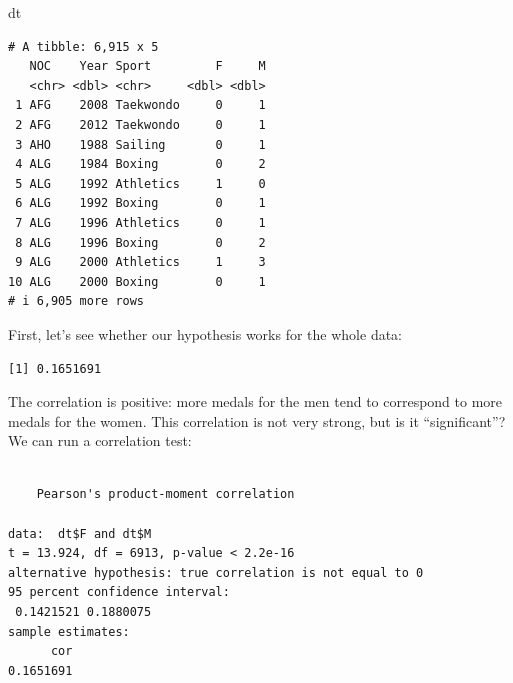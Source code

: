 \documentclass[
  letterpaper,
  DIV=11,
  numbers=noendperiod]{scrreprt}
\newenvironment{Shaded}{\begin{snugshade}}{\end{snugshade}}
\newcommand{\FunctionTok}[1]{\textcolor[rgb]{0.28,0.35,0.67}{#1}}
\newcommand{\NormalTok}[1]{\textcolor[rgb]{0.00,0.23,0.31}{#1}}
\newcommand{\SpecialCharTok}[1]{\textcolor[rgb]{0.37,0.37,0.37}{#1}}
\begin{document}
\begin{Shaded}
\begin{Highlighting}[]
\NormalTok{dt}
\end{Highlighting}
\end{Shaded}

\begin{verbatim}
# A tibble: 6,915 x 5
   NOC    Year Sport         F     M
   <chr> <dbl> <chr>     <dbl> <dbl>
 1 AFG    2008 Taekwondo     0     1
 2 AFG    2012 Taekwondo     0     1
 3 AHO    1988 Sailing       0     1
 4 ALG    1984 Boxing        0     2
 5 ALG    1992 Athletics     1     0
 6 ALG    1992 Boxing        0     1
 7 ALG    1996 Athletics     0     1
 8 ALG    1996 Boxing        0     2
 9 ALG    2000 Athletics     1     3
10 ALG    2000 Boxing        0     1
# i 6,905 more rows
\end{verbatim}

First, let's see whether our hypothesis works for the whole data:

\begin{Shaded}
\end{Shaded}

\begin{verbatim}
[1] 0.1651691
\end{verbatim}

The correlation is positive: more medals for the men tend to correspond
to more medals for the women. This correlation is not very strong, but
is it ``significant''? We can run a correlation test:

\begin{Shaded}
\end{Shaded}

\begin{verbatim}

    Pearson's product-moment correlation

data:  dt$F and dt$M
t = 13.924, df = 6913, p-value < 2.2e-16
alternative hypothesis: true correlation is not equal to 0
95 percent confidence interval:
 0.1421521 0.1880075
sample estimates:
      cor 
0.1651691 
\end{verbatim}
\end{document}
